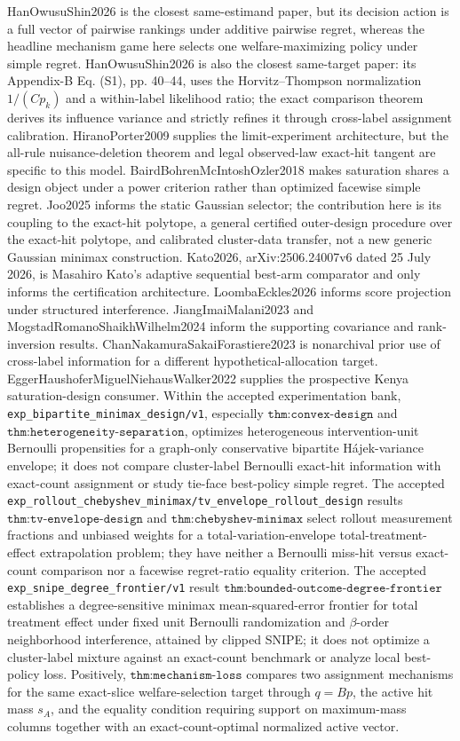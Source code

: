 \documentclass{article}
\begin{document}
HanOwusuShin2026 is the closest same-estimand paper, but its decision action is a full vector of pairwise rankings under additive pairwise regret, whereas the headline mechanism game here selects one welfare-maximizing policy under simple regret. HanOwusuShin2026 is also the closest same-target paper: its Appendix-B Eq. (S1), pp. 40--44, uses the Horvitz--Thompson normalization \(1/(Cp_k)\) and a within-label likelihood ratio; the exact comparison theorem derives its influence variance and strictly refines it through cross-label assignment calibration. HiranoPorter2009 supplies the limit-experiment architecture, but the all-rule nuisance-deletion theorem and legal observed-law exact-hit tangent are specific to this model. BairdBohrenMcIntoshOzler2018 makes saturation shares a design object under a power criterion rather than optimized facewise simple regret. Joo2025 informs the static Gaussian selector; the contribution here is its coupling to the exact-hit polytope, a general certified outer-design procedure over the exact-hit polytope, and calibrated cluster-data transfer, not a new generic Gaussian minimax construction. Kato2026, arXiv:2506.24007v6 dated 25 July 2026, is Masahiro Kato's adaptive sequential best-arm comparator and only informs the certification architecture. LoombaEckles2026 informs score projection under structured interference. JiangImaiMalani2023 and MogstadRomanoShaikhWilhelm2024 inform the supporting covariance and rank-inversion results. ChanNakamuraSakaiForastiere2023 is nonarchival prior use of cross-label information for a different hypothetical-allocation target. EggerHaushoferMiguelNiehausWalker2022 supplies the prospective Kenya saturation-design consumer. Within the accepted experimentation bank, \texttt{exp\_bipartite\_minimax\_design/v1}, especially \(\texttt{thm:convex-design}\) and \(\texttt{thm:heterogeneity-separation}\), optimizes heterogeneous intervention-unit Bernoulli propensities for a graph-only conservative bipartite H\'ajek-variance envelope; it does not compare cluster-label Bernoulli exact-hit information with exact-count assignment or study tie-face best-policy simple regret. The accepted \texttt{exp\_rollout\_chebyshev\_minimax/tv\_envelope\_rollout\_design} results \(\texttt{thm:tv-envelope-design}\) and \(\texttt{thm:chebyshev-minimax}\) select rollout measurement fractions and unbiased weights for a total-variation-envelope total-treatment-effect extrapolation problem; they have neither a Bernoulli miss-hit versus exact-count comparison nor a facewise regret-ratio equality criterion. The accepted \texttt{exp\_snipe\_degree\_frontier/v1} result \(\texttt{thm:bounded-outcome-degree-frontier}\) establishes a degree-sensitive minimax mean-squared-error frontier for total treatment effect under fixed unit Bernoulli randomization and \(\beta\)-order neighborhood interference, attained by clipped SNIPE; it does not optimize a cluster-label mixture against an exact-count benchmark or analyze local best-policy loss. Positively, \(\texttt{thm:mechanism-loss}\) compares two assignment mechanisms for the same exact-slice welfare-selection target through \(q=Bp\), the active hit mass \(s_A\), and the equality condition requiring support on maximum-mass columns together with an exact-count-optimal normalized active vector.
\end{document}
